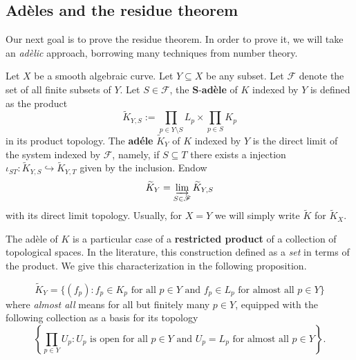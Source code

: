 \subsection{Adèles and the residue theorem}
Our next goal is to prove the residue theorem. In order to prove it, we will take an \textit{adèlic} approach, borrowing many techniques from number theory.
\begin{definition}\label{def:adele-ring-over-algebraic-curve}
	Let $X$ be a smooth algebraic curve. Let $Y \subseteq X$ be any subset. Let $\mathscr{F}$ denote the set of all finite subsets of $Y$. Let $S \in \mathscr{F}$, the $\mathbf{S}$-\textbf{adèle} of $K$ indexed by $Y$ is defined as the product
	\[
		\widetilde{K}_{Y,S} := \prod_{p\in Y\setminus S}L_{p} \times \prod_{p\in S}K_{p}
	\]
	in its product topology. The \textbf{adéle} $\widetilde{K}_{Y}$ of $K$ indexed by $Y$ is the direct limit of the system indexed by $\mathscr{F}$, namely, if $S \subseteq T$ there exists a injection $\iota_{ST}\colon \widetilde{K}_{Y,S} \hookrightarrow \widetilde{K}_{Y,T}$ given by the inclusion. Endow
	\[
		\widetilde{K}_{Y} = \varinjlim_{S \in \mathscr{F}} \widetilde{K}_{Y,S}
	\]
	with its direct limit topology. Usually, for $X = Y$ we will simply write $\widetilde{K}$ for $\widetilde{K}_{X}$.
\end{definition}
The adèle of $K$ is a particular case of a \textbf{restricted product} of a collection of topological spaces. In the literature, this construction defined as a \textit{set} in terms of the product. We give this characterization in the following proposition.
\begin{proposition}\label{prop:adèle-as-subset-of-product}
	\[
		\widetilde{K}_{Y} = \{(f_{p})\colon f_{p} \in K_{p}\text{ for all }p \in Y\text{ and }f_{p}\in L_{p}\text{ for almost all }p\in Y\}
	\]
	where \textit{almost all} means for all but finitely many $p\in Y$, equipped with the following collection as a basis for its topology
	\[
		\left\{\prod_{p\in Y} U_{p} \colon U_{p}\text{ is open for all }p\in Y\text{ and }U_{p} = L_{p}\text{ for almost all }p\in Y\right\}.
	\]
\end{proposition}
